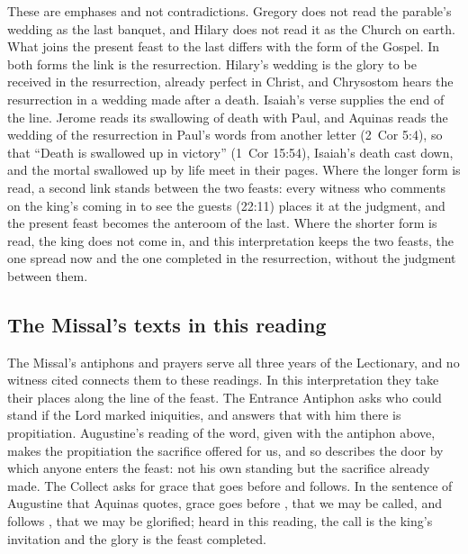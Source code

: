 These are emphases and not contradictions. Gregory does not read the
parable's wedding as the last banquet, and Hilary does not read it as the
Church on earth. What joins the present feast to the last differs with the
form of the Gospel. In both forms the link is the resurrection. Hilary's
wedding is the glory to be received in the resurrection, already perfect in
Christ, and Chrysostom hears the resurrection in a wedding made after a death.
Isaiah's verse supplies the end of the line. Jerome reads its swallowing of
death with Paul, and Aquinas reads the wedding of the resurrection in Paul's
words from another letter (2~Cor 5:4), so that ``Death is swallowed up in
victory'' (1~Cor 15:54), Isaiah's death cast down, and the mortal swallowed up
by life meet in their pages. Where the longer form is read, a second link
stands between the two feasts: every witness who comments on the king's
coming in to see the guests (22:11) places it at the judgment, and the
present feast becomes the anteroom of the last. Where the shorter form is
read, the king does not come in, and this interpretation keeps the two feasts,
the one spread now and the one completed in the resurrection, without the
judgment between them.

\subsection{The Missal's texts in this reading}

The Missal's antiphons and prayers serve all three years of the Lectionary,
and no witness cited connects them to these readings. In this interpretation
they take their places along the line of the feast. The Entrance Antiphon asks who could stand if the Lord marked
iniquities, and answers that with him there is propitiation. Augustine's
reading of the word, given with the antiphon above, makes the propitiation
the sacrifice offered for us, and so describes the door by which anyone enters
the feast: not his own standing but the sacrifice already made.
The Collect asks for grace that goes before and follows. In the sentence of
Augustine that Aquinas quotes, grace goes before , that we
may be called, and follows , that we may be glorified;
heard in this reading, the call is the king's invitation and the glory is the
feast completed.

